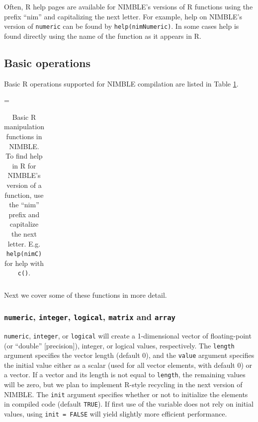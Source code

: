 \documentclass[12pt,oneside]{book}\usepackage[]{graphicx}\usepackage[]{color}
\def\cd#1{\texttt{#1}}
\begin{document}
Often, R help pages are available for NIMBLE's versions of R functions
using the prefix ``nim'' and capitalizing the next letter.  For
example, help on NIMBLE's version of \cd{numeric} can be found by \cd{help(nimNumeric)}. In some cases help is found directly using the name of the function as it appears in R. 

\subsection{Basic operations}

Basic R operations supported for NIMBLE compilation are listed in
Table \ref{table:functions-coreR}.

{
\footnotesize 
\LTcapwidth=\textwidth
\begin{longtable}[c]{ll}
 \caption{Basic R manipulation functions in NIMBLE.  To find help in R for NIMBLE's version of a function, use the ``nim'' prefix and capitalize the next letter.  E.g. \cd{help(nimC)} for help with \cd{c()}.} \label{table:functions-coreR} \\
 \hline

\end{longtable}
}

Next we cover some of these functions in more detail. 


\subsubsection{\cd{numeric}, \cd{integer}, \cd{logical}, \cd{matrix}
  and \cd{array}}

\cd{numeric}, \cd{integer}, or \cd{logical} will create a 1-dimensional vector of
floating-point (or ``double'' [precision]), integer, or logical values, respectively.  The \cd{length} argument specifies the vector 
length (default 0), and the \cd{value} argument specifies the initial 
 value either as a scalar (used for all vector elements, with default
 0) or a vector. If a vector and its length is not equal to \cd{length}, the remaining values will be zero, but we plan to implement R-style recycling in the next version of NIMBLE. The \cd{init} argument specifies 
whether or not to initialize the elements in compiled code (default \cd{TRUE}).  If
first use of the variable does not rely on initial values,  using
\cd{init = FALSE} will yield slightly more efficient performance.
\end{document}
